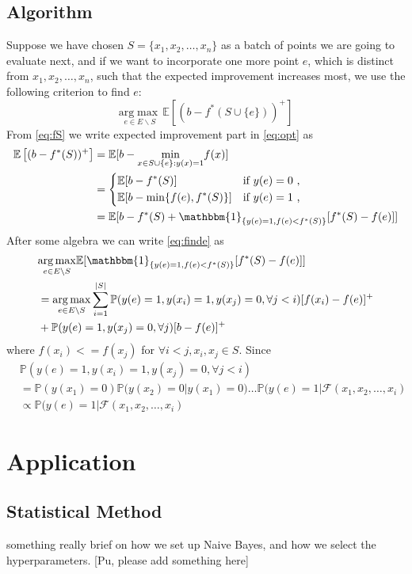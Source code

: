 \documentclass[12pt]{article}
\newcommand{\E}{\mathbb{E}}
\begin{document}
\subsection{Algorithm}
Suppose we have chosen $S=\{x_1, x_2, \ldots, x_n\}$ as a batch of points we are going to evaluate next, and if we want to incorporate one more point $e$, which is distinct from $x_1, x_2, \ldots, x_n$, such that the expected improvement increases most, we use the following criterion to find $e$:
\begin{equation} \label{eq:finde}
\underset{e \in E \backslash S}{\mathrm{arg}\max} \, \E \left[ (b-f^*(S \cup \{e\}))^+ \right]
\end{equation}
From \eqref{eq:fS} we write expected improvement part in \eqref{eq:opt} as
\begin{align*}
\E \left[ (b-f^*(S))^+ \right] &= \E [b-\underset{x \in S \cup \{e\}:y(x)=1}{\min} f(x)] \\
                  &=
                  \begin{dcases}
                    \E [b- f^*(S)] & \text{if $y(e)=0$ ,} \\
                    \E [b- \min \{f(e), f^*(S)\}]       & \text{if $y(e)=1$ ,}
                    \end{dcases} \\
                  &= \E [b-f^*(S) + \mathbbm{1}_{\{y(e)=1, f(e) < f^*(S)\}} [f^*(S)-f(e)] ]
\end{align*}
After some algebra we can write \eqref{eq:finde} as
\begin{align*}
&\underset{e \in E \backslash S}{\mathrm{arg}\max} \E [ \mathbbm{1}_{\{y(e)=1, f(e) < f^*(S)\}} [f^*(S)-f(e)] ] \\
&= \underset{e \in E \backslash S}{\mathrm{arg}\max} \sum_{i=1}^{|S|} \mathbb{P} (y(e)=1, y(x_i)=1, y(x_j)=0, \forall j <i) [f(x_i)-f(e)]^+ \\
&+ \mathbb{P} (y(e)=1, y(x_j)=0, \forall j) [b-f(e)]^+
\end{align*}
where $f(x_i)<=f(x_j)$ for $\forall i<j, x_i,x_j \in S$.
Since
\begin{align*}
&\mathbb{P} (y(e)=1, y(x_i)=1, y(x_j)=0, \forall j <i)\\
&= \mathbb{P}(y(x_1)=0) \mathbb{P}(y(x_2)=0|y(x_1)=0) \ldots \mathbb{P}(y(e)=1|\mathcal{F}(x_1,x_2,\ldots,x_i)\\
&\propto \mathbb{P}(y(e)=1|\mathcal{F}(x_1,x_2,\ldots,x_i)
\end{align*}



\section{Application}
\subsection{Statistical Method}
something really brief on how we set up Naive Bayes,
and how we select the hyperparameters.  [Pu, please add something here]
\end{document}
